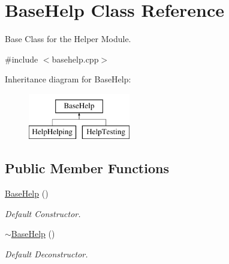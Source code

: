 \hypertarget{classBaseHelp}{}\section{Base\+Help Class Reference}
\label{classBaseHelp}


Base Class for the Helper Module.  




{\ttfamily \#include $<$basehelp.\+cpp$>$}

Inheritance diagram for Base\+Help\+:\begin{figure}[H]
\begin{center}
\leavevmode
\includegraphics[height=2.000000cm]{classBaseHelp}
\end{center}
\end{figure}
\subsection*{Public Member Functions}
\begin{DoxyCompactItemize}
\item 
\mbox{\label{classBaseHelp_af1b532131afc0a5cea0ac99d218c58a2}} 
\mbox{\hyperlink{classBaseHelp_af1b532131afc0a5cea0ac99d218c58a2}{Base\+Help}} ()
\begin{DoxyCompactList}\small\item\em Default Constructor. \end{DoxyCompactList}\item 
\mbox{\label{classBaseHelp_a21cd268ab6b2cc103f3175f744fafdbc}} 
\mbox{\hyperlink{classBaseHelp_a21cd268ab6b2cc103f3175f744fafdbc}{$\sim$\+Base\+Help}} ()
\begin{DoxyCompactList}\small\item\em Default Deconstructor. \end{DoxyCompactList}\end{DoxyCompactItemize}
